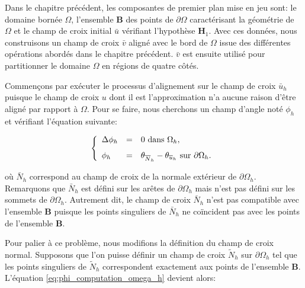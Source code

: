 Dans le chapitre précédent, les composantes de premier plan mise en jeu sont: le domaine bornée $\Omega$, l'ensemble $\mathbf{B}$ des points de $\partial\Omega$ caractérisant la géométrie de $\Omega$ et le champ de croix initial $\bar{u}$ vérifiant l'hypothèse $\mathbf{H}_1$. Avec ces données, nous construisons un champ de croix $\bar{v}$ aligné avec le bord de $\Omega$ issue des différentes opérations abordés dans le chapitre précédent. $\bar{v}$ est ensuite utilisé pour partitionner le domaine $\Omega$ en régions de quatre côtés.

Commençons par exécuter le processus d'alignement sur le champ de croix $\bar{u}_h$ puisque le champ de croix $u$ dont il est l'approximation n'a aucune raison d'être aligné par rapport à $\Omega$. Pour se faire, nous cherchons un champ d'angle noté $\phi_h$ et vérifiant l'équation suivante:

\begin{equation}
\left\{
\begin{array}{lcl}
\Delta\phi_h &=& 0 \mbox{ dans }\Omega_h,\\[0.25cm]
\phi_h &=& \theta_{\Bar{N}_h}-\theta_{\bar{u}_h} \mbox{ sur } \partial\Omega_h.
\end{array}
\right.
\label{eq:phi_computation_omega_h}
\end{equation}

où $\bar{N}_h$ correspond au champ de croix de la normale extérieur de $\partial\Omega_h$. Remarquons que $\bar{N}_h$ est défini sur les arêtes de $\partial\Omega_h$ mais n'est pas défini sur les sommets de $\partial\Omega_h$. Autrement dit, le champ de croix $\bar{N}_h$ n'est pas compatible avec l'ensemble $\mathbf{B}$ puisque les points singuliers de $\bar{N}_h$ ne coïncident pas avec les points de l'ensemble $\mathbf{B}$. 


Pour palier à ce problème, nous modifions la définition du champ de croix normal. Supposons que l'on puisse définir un champ de croix $\widetilde{N}_h$ sur $\partial\Omega_h$ tel que les points singuliers de $\widetilde{N}_h$ correspondent exactement aux points de l'ensemble $\mathbf{B}$. L'équation \eqref{eq:phi_computation_omega_h} devient alors:

